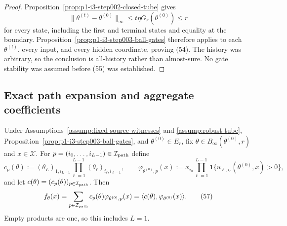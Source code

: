 \begin{proof}
Proposition~\ref{prop:p1-i3-step002-closed-tube} gives
\[
\|\theta^{(t)}-\theta^{(0)}\|_\infty
\leq t\eta G_r(\theta^{(0)})\leq r
\tag{55}
\]
for every state, including the first and terminal states and equality at the
boundary.  Proposition~\ref{prop:p1-i3-step003-ball-gates} therefore applies
to each $\theta^{(t)}$, every input, and every hidden coordinate, proving
(54).  The history was arbitrary, so the conclusion is all-history rather
than almost-sure.  No gate stability was assumed before (55) was established.
\end{proof}
\subsection{Exact path expansion and aggregate coefficients}
\label{app:step004-paths}

\begin{lemma}
\label{lem:p1-i3-step004-path-expansion}
Under Assumptions~\ref{assump:fixed-source-witnesses} and
\ref{assump:robust-tube}, Proposition~\ref{prop:p1-i3-step003-ball-gates},
and $\theta^{(0)}\in E_r$, fix
$\theta\in B_\infty(\theta^{(0)},r)$ and $x\in\mathcal X$.  For
$p=(i_0,\ldots,i_{L-1})\in\mathcal I_{\rm path}$ define
\[
c_p(\theta):=(\theta_L)_{1,i_{L-1}}
\prod_{\ell=1}^{L-1}(\theta_\ell)_{i_\ell,i_{\ell-1}},
\qquad
\varphi_{\theta^{(0)},p}(x):=x_{i_0}
\prod_{\ell=1}^{L-1}
\mathbf1\{u_{\ell,i_\ell}(\theta^{(0)},x)>0\},
\tag{56}
\]
and let $c(\theta)=(c_p(\theta))_{p\in\mathcal I_{\rm path}}$.  Then
\[
f_\theta(x)=\sum_{p\in\mathcal I_{\rm path}}c_p(\theta)
\varphi_{\theta^{(0)},p}(x)
=\langle c(\theta),\varphi_{\theta^{(0)}}(x)\rangle.
\tag{57}
\]
Empty products are one, so this includes $L=1$.
\end{lemma}

